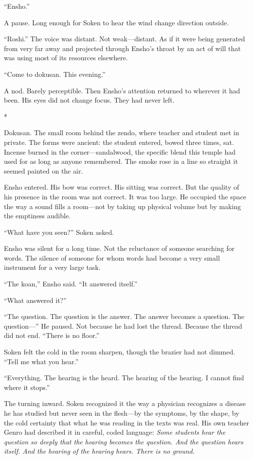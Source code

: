 ``Ensho.''

A pause. Long enough for Soken to hear the wind change direction outside.

``Roshi.'' The voice was distant. Not weak---distant. As if it were being generated from very far away and projected through Ensho's throat by an act of will that was using most of its resources elsewhere.

``Come to dokusan. This evening.''

A nod. Barely perceptible. Then Ensho's attention returned to wherever it had been. His eyes did not change focus. They had never left.

\begin{center}
*\quad*\quad*
\end{center}

Dokusan. The small room behind the zendo, where teacher and student met in private. The forms were ancient: the student entered, bowed three times, sat. Incense burned in the corner---sandalwood, the specific blend this temple had used for as long as anyone remembered. The smoke rose in a line so straight it seemed painted on the air.

Ensho entered. His bow was correct. His sitting was correct. But the quality of his presence in the room was not correct. It was too large. He occupied the space the way a sound fills a room---not by taking up physical volume but by making the emptiness audible.

``What have you seen?'' Soken asked.

Ensho was silent for a long time. Not the reluctance of someone searching for words. The silence of someone for whom words had become a very small instrument for a very large task.

``The koan,'' Ensho said. ``It answered itself.''

``What answered it?''

``The question. The question is the answer. The answer becomes a question. The question---'' He paused. Not because he had lost the thread. Because the thread did not end. ``There is no floor.''

Soken felt the cold in the room sharpen, though the brazier had not dimmed. ``Tell me what you hear.''

``Everything. The hearing is the heard. The hearing of the hearing. I cannot find where it stops.''

The turning inward. Soken recognized it the way a physician recognizes a disease he has studied but never seen in the flesh---by the symptoms, by the shape, by the cold certainty that what he was reading in the texts was real. His own teacher Genro had described it in careful, coded language: \emph{Some students hear the question so deeply that the hearing becomes the question. And the question hears itself. And the hearing of the hearing hears. There is no ground.}

